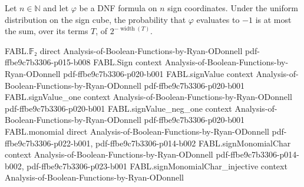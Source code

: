 \begin{theorem}
\label{FABL.DNFFormula.uniformProbability_eval_neg_one_le_term_sum}
\leanok
{}
Let $n\in\mathbb{N}$ and let $\varphi$ be a DNF formula on $n$ sign coordinates. Under
the uniform distribution on the sign cube, the probability that $\varphi$ evaluates to
$-1$ is at most the sum, over its terms $T$, of $2^{-\operatorname{width}(T)}$.
\end{theorem}

\begin{theorem}
\label{FABL.DNFFormula.size_lower_bound_of_computes_parity}
\leanok
{}
\proofstep
  {FABL.𝔽₂}
  {direct}
  {Analysis-of-Boolean-Functions-by-Ryan-ODonnell}
  {pdf-ffbe9c7b3306-p015-b008}
\proofstep
  {FABL.Sign}
  {context}
  {Analysis-of-Boolean-Functions-by-Ryan-ODonnell}
  {pdf-ffbe9c7b3306-p020-b001}
\proofstep
  {FABL.signValue}
  {context}
  {Analysis-of-Boolean-Functions-by-Ryan-ODonnell}
  {pdf-ffbe9c7b3306-p020-b001}
\proofstep
  {FABL.signValue_one}
  {context}
  {Analysis-of-Boolean-Functions-by-Ryan-ODonnell}
  {pdf-ffbe9c7b3306-p020-b001}
\proofstep
  {FABL.signValue_neg_one}
  {context}
  {Analysis-of-Boolean-Functions-by-Ryan-ODonnell}
  {pdf-ffbe9c7b3306-p020-b001}
\proofstep
  {FABL.monomial}
  {direct}
  {Analysis-of-Boolean-Functions-by-Ryan-ODonnell}
  {pdf-ffbe9c7b3306-p022-b001,
    pdf-ffbe9c7b3306-p014-b002}
\proofstep
  {FABL.signMonomialChar}
  {context}
  {Analysis-of-Boolean-Functions-by-Ryan-ODonnell}
  {pdf-ffbe9c7b3306-p014-b002,
    pdf-ffbe9c7b3306-p023-b001}
\proofstep
  {FABL.signMonomialChar_injective}
  {context}
  {Analysis-of-Boolean-Functions-by-Ryan-ODonnell}

\end{theorem}

